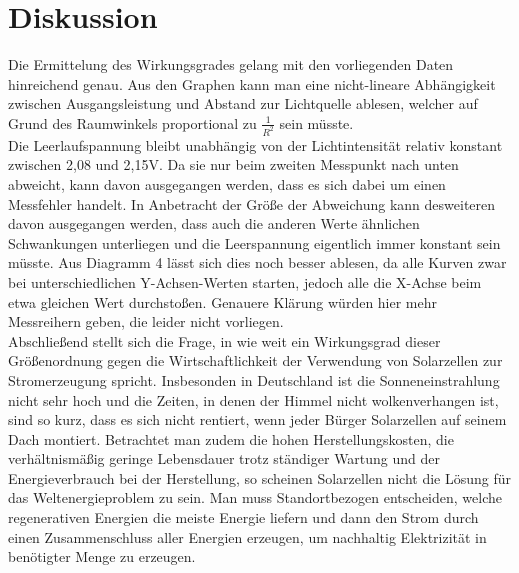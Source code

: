 \section{Diskussion}
Die Ermittelung des Wirkungsgrades gelang mit den vorliegenden Daten hinreichend genau. 
Aus den Graphen kann man eine nicht-lineare Abhängigkeit zwischen Ausgangsleistung und Abstand zur Lichtquelle ablesen, welcher auf Grund des Raumwinkels proportional zu $\frac{1}{R^2}$ sein müsste.\\
Die Leerlaufspannung bleibt unabhängig von der Lichtintensität relativ konstant zwischen 2,08 und 2,15V. Da sie nur beim zweiten Messpunkt nach unten abweicht, kann davon ausgegangen werden, dass es sich dabei um einen Messfehler handelt. In Anbetracht der Größe der Abweichung kann desweiteren davon ausgegangen werden, dass auch die anderen Werte ähnlichen Schwankungen unterliegen und die Leerspannung eigentlich immer konstant sein müsste. Aus Diagramm 4 lässt sich dies noch besser ablesen, da alle Kurven zwar bei unterschiedlichen Y-Achsen-Werten starten, jedoch alle die X-Achse beim etwa gleichen Wert durchstoßen.  Genauere Klärung würden hier mehr Messreihern geben, die leider nicht vorliegen.\\
Abschließend stellt sich die Frage, in wie weit ein Wirkungsgrad dieser Größenordnung gegen die Wirtschaftlichkeit der Verwendung von Solarzellen zur Stromerzeugung spricht. Insbesonden in Deutschland ist die Sonneneinstrahlung nicht sehr hoch und die Zeiten, in denen der Himmel nicht wolkenverhangen ist, sind so kurz, dass es sich nicht rentiert, wenn jeder Bürger Solarzellen auf seinem Dach montiert.
Betrachtet man zudem die hohen Herstellungskosten, die verhältnismäßig geringe Lebensdauer trotz ständiger Wartung und der Energieverbrauch bei der Herstellung, so scheinen Solarzellen nicht die Lösung für das Weltenergieproblem zu sein. Man muss Standortbezogen entscheiden, welche regenerativen Energien die meiste Energie liefern und dann den Strom durch einen Zusammenschluss aller Energien erzeugen, um nachhaltig Elektrizität in benötigter Menge zu erzeugen. 





